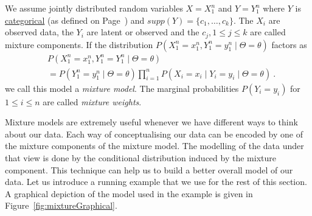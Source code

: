 \documentclass[11pt,leqno,a4paper]{report}\usepackage[]{graphicx}\usepackage[]{color}
\begin{document}
\begin{Definition}\label{def:mixtureModel}
We assume jointly distributed random variables $ X=X_{1}^{n} $ and $
Y=Y_{1}^{n} $ where $ Y $ is \href{https://en.wikipedia.org/wiki/Categorical_variable}{categorical} (as defined on Page~\pageref{lab:categorical}) and
$ supp(Y) = \{c_{1}, \ldots, c_{k}\} $. The $ X_{i} $ are observed data, the $ Y_{i} $ are latent
or observed and the $ c_{j}, 1\leq j \leq k $ are called mixture components. 
If the distribution
$ P(X_{1}^{n}=x_{1}^{n}, Y_{1}^{n} = y_{1}^{n}\mid \Theta = \theta) $ factors as
\begin{align*}
&P(X_{1}^{n}=x_{1}^{n}, Y_{1}^{n} = Y_{1}^{n}\mid \Theta = \theta)  \\
&= P(Y_{1}^{n} = y_{1}^{n}\mid \Theta = \theta) \prod_{i=1}^{n} 
P(X_{i}=x_{i} \mid Y_{i} = y_{i}\mid \Theta = \theta) \ .
\end{align*}
we call this model a \emph{mixture model}. The marginal probabilities $ P(Y_{i}=y_{i}) $ for $ 1 \leq i \leq n $ are called
\emph{mixture weights}.
\end{Definition}

Mixture models are extremely useful whenever we have different ways to think about our data. Each way
of conceptualising our data can be encoded by one of the mixture components of the mixture model. The modelling
of the data under that view is done by the conditional distribution induced by the mixture component.
This technique can help us to build a better overall model of our data. Let us introduce a running example that
we use for the rest of this section. A graphical depiction of the model used in the example is given in Figure~\ref{fig:mixtureGraphical}.
\end{document}
